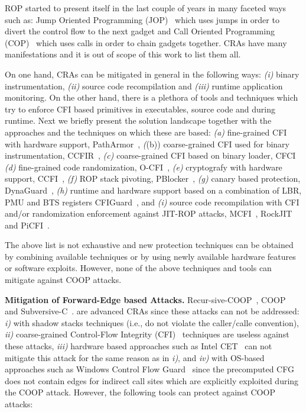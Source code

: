 ROP started to present itself in the last couple of years in many faceted ways such as:
Jump Oriented Programming (JOP)~\cite{JOP1, JOP2, JOP3} which uses jumps in order to divert the control flow to the next gadget and 
Call Oriented Programming (COP)~\cite{rop:carlini} which uses calls in order to chain gadgets together.
CRAs have many manifestations and it is out of scope of this work to list them all.

On one hand, CRAs can be mitigated in general in the following ways: 
\textit{(i)} binary instrumentation,
\textit{(ii)} source code recompilation and 
\textit{(iii)} runtime application monitoring.
On the other hand, there is a plethora of tools and techniques which try to enforce CFI based
primitives in executables, source code and during runtime. Next we briefly
present the solution landscape together with the approaches and the techniques on which these are based:
\textit{(a)} fine-grained CFI with hardware support, PathArmor~\cite{veen:cfi},
\textit((b)) coarse-grained CFI used for binary instrumentation, CCFIR~\cite{ccfir:zhang},
\textit{(c)} coarse-grained CFI based on binary loader, CFCI~\cite{cfci:zhang}
\textit{(d)} fine-grained code randomization, O-CFI~\cite{mohan:opaque},
\textit{(e)} cryptografy with hardware support, CCFI~\cite{ccfi:jose},
\textit{(f)} ROP stack pivoting, PBlocker~\cite{pblocker:prakash},
\textit{(g)} canary based protection, DynaGuard~\cite{dynaguard:petsios},
\textit{(h)} runtime and hardware support based on a combination of LBR, PMU and BTS registers CFIGuard~\cite{cfiguard:yuan}, and
\textit{(i)} source code recompilation with CFI and/or randomization enforcement against JIT-ROP attacks, MCFI~\cite{mcfi:niu}, 
RockJIT~\cite{rockjit:niu} and PiCFI~\cite{perinput:niu}.

The above list is not exhaustive and new protection techniques can be obtained by combining available techniques
or by using newly available hardware features or software exploits. However, none of the above techniques and tools 
can mitigate against COOP attacks.


\textbf{Mitigation of Forward-Edge based Attacks.}
\label{Mitigation of Advanced Code-Reuse Attacks}
Recur-sive-COOP~\cite{crane:readactor++}, COOP~\cite{schuster:coop} and Subversive-C~\cite{subversive-c:lettner}.
are advanced CRAs since these attacks can not be addressed:
\textit{i)}  with shadow stacks techniques (i.e., do not violate the caller/calle convention), 
\textit{ii)} coarse-grained Control-Flow Integrity (CFI)~\cite{abadi:cfi2, abadi:cfi} techniques are useless against these attacks, 
\textit{iii)} hardware based approaches such as Intel CET~\cite{intel:cet} can not mitigate this attack for the same reason as in \textit{i)}, and 
\textit{iv)} with OS-based approaches such as Windows Control Flow Guard~\cite{windows:cfguard} 
since the precomputed CFG does not contain edges for indirect call sites which are explicitly exploited during the COOP attack.
However, the following tools can protect against COOP attacks:

